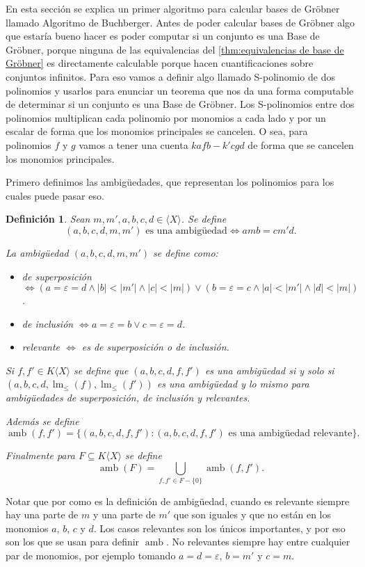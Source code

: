 \documentclass[12pt]{report}
\theoremstyle{customstyle}
\newtheorem{definition}[theorem]{Definición}
\theoremstyle{factstyle}
\DeclareMathOperator{\lm}{lm}
\DeclareMathOperator{\amb}{amb}
\begin{document}
En esta sección se explica un primer algoritmo para calcular bases de Gröbner llamado Algoritmo de Buchberger. Antes de poder calcular bases de Gröbner algo que estaría bueno hacer es poder computar si un conjunto es una Base de Gröbner, porque ninguna de las equivalencias del \cref{thm:equivalencias de base de Gröbner} es directamente calculable porque hacen cuantificaciones sobre conjuntos infinitos. Para eso vamos a definir algo llamado S-polinomio de dos polinomios y usarlos para enunciar un teorema que nos da una forma computable de determinar si un conjunto es una Base de Gröbner. Los S-polinomios entre dos polinomios multiplican cada polinomio por monomios a cada lado y por un escalar de forma que los monomios principales se cancelen. O sea, para polinomios $f$ y $g$ vamos a tener una cuenta $k a f b - k' c g d$ de forma que se cancelen los monomios principales.

Primero definimos las ambigüedades, que representan los polinomios para los cuales puede pasar eso.

\begin{definition}
  Sean $m, m', a, b, c, d ∈ ⟨X⟩$. Se define
  \[ (a, b, c, d, m, m')\text{ es una ambigüedad} ⇔ amb = cm'd \text{.}\]

  La ambigüedad $(a, b, c, d, m, m')$ se define como:
  \begin{itemize}
    \item de superposición $⇔ (a = ε = d ∧ |b| < |m'| ∧ |c| < |m|) ∨ (b = ε = c ∧ |a| < |m'| ∧ |d| < |m|)$.
    \item de inclusión $⇔ a = ε = b ∨ c = ε = d$.
    \item relevante $⇔$ es de superposición o de inclusión.
  \end{itemize}

  Si $f, f' ∈ K⟨X⟩$ se define que $(a, b, c, d, f, f')$ es una ambigüedad si y solo si $(a, b, c, d, \lm_≤{(f)}, \lm_≤{(f')})$ es una ambigüedad y lo mismo para ambigüedades de superposición, de inclusión y relevantes.

  Además se define
  \[ \amb(f, f') = \{(a, b, c, d, f, f') : (a, b, c, d, f, f')\text{ es una ambigüedad relevante}\} \text{.} \]

  Finalmente para $F ⊆ K⟨X⟩$ se define
  \[ \amb(F) = ⋃_{f, f' ∈ F - \{0\}}{\amb(f, f')} \text{.} \]

\end{definition}

Notar que por como es la definición de ambigüedad, cuando es relevante siempre hay una parte de $m$ y una parte de $m'$ que son iguales y que no están en los monomios $a$, $b$, $c$ y $d$. Los casos relevantes son los únicos importantes, y por eso son los que se usan para definir $\amb$. No relevantes siempre hay entre cualquier par de monomios, por ejemplo tomando $a = d = ε$, $b = m'$ y $c = m$.
\end{document}
